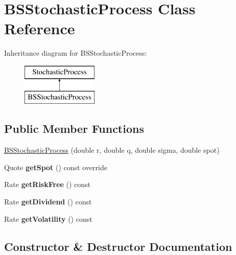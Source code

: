 \hypertarget{class_b_s_stochastic_process}{}\section{B\+S\+Stochastic\+Process Class Reference}
\label{class_b_s_stochastic_process}
Inheritance diagram for B\+S\+Stochastic\+Process\+:\begin{figure}[H]
\begin{center}
\leavevmode
\includegraphics[height=2.000000cm]{class_b_s_stochastic_process}
\end{center}
\end{figure}
\subsection*{Public Member Functions}
\begin{DoxyCompactItemize}
\item 
\hyperlink{class_b_s_stochastic_process_aed9545004ecc3b8a23e95e6406f48327}{B\+S\+Stochastic\+Process} (double r, double q, double sigma, double spot)
\item 
\hypertarget{class_b_s_stochastic_process_a604f867d372fc55a6dfae456f56604ea}{}\label{class_b_s_stochastic_process_a604f867d372fc55a6dfae456f56604ea} 
Quote {\bfseries get\+Spot} () const override
\item 
\hypertarget{class_b_s_stochastic_process_a9cd46cb3dceb0aee302bf3a6c2ea39a1}{}\label{class_b_s_stochastic_process_a9cd46cb3dceb0aee302bf3a6c2ea39a1} 
Rate {\bfseries get\+Risk\+Free} () const
\item 
\hypertarget{class_b_s_stochastic_process_a42caffac3e61f92af6849b86df0d9b6b}{}\label{class_b_s_stochastic_process_a42caffac3e61f92af6849b86df0d9b6b} 
Rate {\bfseries get\+Dividend} () const
\item 
\hypertarget{class_b_s_stochastic_process_ab63f363e94441ed0ee22ef10beea16a6}{}\label{class_b_s_stochastic_process_ab63f363e94441ed0ee22ef10beea16a6} 
Rate {\bfseries get\+Volatility} () const
\end{DoxyCompactItemize}


\subsection{Constructor \& Destructor Documentation}
\hypertarget{class_b_s_stochastic_process_aed9545004ecc3b8a23e95e6406f48327}{}\label{class_b_s_stochastic_process_aed9545004ecc3b8a23e95e6406f48327} 

